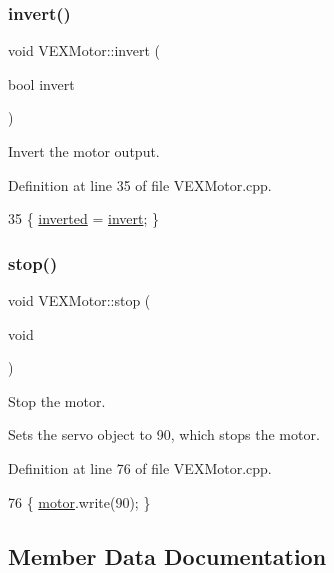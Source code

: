 \subsubsection{\texorpdfstring{invert()}{invert()}}
{\footnotesize\ttfamily void V\+E\+X\+Motor\+::invert (\begin{DoxyParamCaption}\item[{bool}]{invert }\end{DoxyParamCaption})}



Invert the motor output. 



Definition at line 35 of file V\+E\+X\+Motor.\+cpp.


\begin{DoxyCode}
35 \{ \hyperlink{class_v_e_x_motor_ae0059b010c3c3185c43918cec2c021e8}{inverted} = \hyperlink{class_v_e_x_motor_a2c4c51b0b9c1c6747e0a8f1cee9f39e3}{invert}; \}
\end{DoxyCode}
\mbox{\label{class_v_e_x_motor_aed9dadedda6a075093f076921958e7ed}} 
\subsubsection{\texorpdfstring{stop()}{stop()}}
{\footnotesize\ttfamily void V\+E\+X\+Motor\+::stop (\begin{DoxyParamCaption}\item[{void}]{ }\end{DoxyParamCaption})}



Stop the motor. 

Sets the servo object to 90, which stops the motor. 

Definition at line 76 of file V\+E\+X\+Motor.\+cpp.


\begin{DoxyCode}
76 \{ \hyperlink{class_v_e_x_motor_a6cc23059af5cd57eafe31c900698d1a1}{motor}.write(90); \}
\end{DoxyCode}


\subsection{Member Data Documentation}
\mbox{\label{class_v_e_x_motor_ae0059b010c3c3185c43918cec2c021e8}} 
